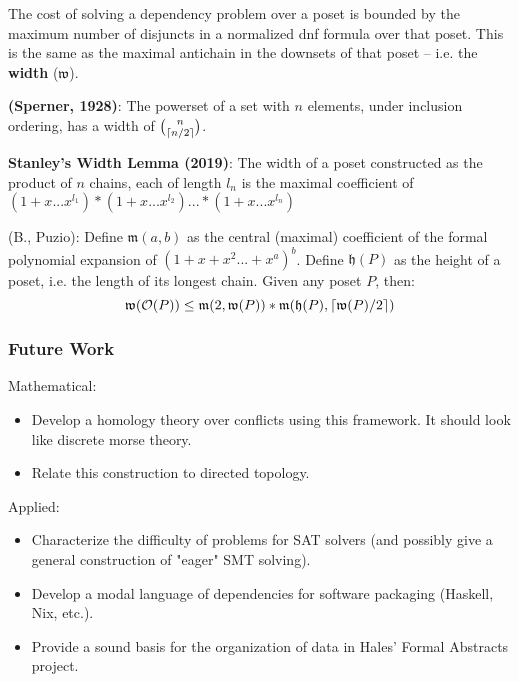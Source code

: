 \documentclass{beamer}
\newcommand{\Oc}{\mathcal{O}}
\newcommand{\Mf}{\mathfrak{m}}
\newcommand{\Wf}{\mathfrak{w}}
\newcommand{\Hf}{\mathfrak{h}}
\DeclarePairedDelimiter\ceil{\lceil}{\rceil}
\begin{document}
\begin{frame}
The cost of solving a dependency problem over a poset is bounded by the maximum number of disjuncts in a normalized dnf formula over that poset. This is the same as the maximal antichain in the downsets of that poset -- i.e. the \textbf{width} (\(\Wf\)).

\begin{theorem}
\textbf{(Sperner, 1928)}: The powerset of a set with \(n\) elements, under inclusion ordering, has a width of \(\binom{n}{\ceil{n/2}}\).
\end{theorem}
\end{frame}

\begin{frame}

\begin{lemma}
\textbf{Stanley's Width Lemma (2019)}: The width of a poset constructed as the product of \(n\) chains, each of length \(l_n\) is the maximal coefficient of \((1+x...x^{l_1})*(1+x...x^{l_2})...*(1+x...x^{l_n})\)
\end{lemma}

\begin{theorem}
(B., Puzio): Define \(\Mf(a,b)\) as the central (maximal) coefficient of the formal polynomial expansion of \((1 + x + x^2 ... + x^a)^b\). Define \(\Hf(P)\) as the height of a poset, i.e. the length of its longest chain. Given any poset \(P\), then:
\begin{equation*}
 \Wf(\Oc(P)) \le \Mf(2,\Wf(P)) * \Mf(\Hf(P),\ceil{\Wf(P)/2})
\end{equation*}
\end{theorem}
\end{frame}

\begin{frame}
\frametitle{Future Work}
Mathematical:
\begin{itemize}
\item Develop a homology theory over conflicts using this framework. It should look like discrete morse theory.
\item Relate this construction to directed topology.
\end{itemize}

Applied:
\begin{itemize}
\item Characterize the difficulty of problems for SAT solvers (and possibly give a general construction of "eager" SMT solving).
\item Develop a modal language of dependencies for software packaging (Haskell, Nix, etc.).
\item Provide a sound basis for the organization of data in Hales' Formal Abstracts project. 
\end{itemize}

\end{frame}
\end{document}
